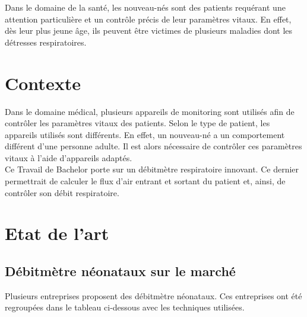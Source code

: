 Dans le domaine de la santé, les nouveau-nés sont des patients requérant une attention particulière et un contrôle précis de leur 
paramètres vitaux. En effet, dès leur plus jeune âge, ils peuvent être victimes de plusieurs maladies dont les détresses respiratoires. 


\section{Contexte}
Dans le domaine médical, plusieurs appareils de monitoring sont utilisés afin de contrôler les paramètres vitaux des patients. 
Selon le type de patient, les appareils utilisés sont différents. En effet, un nouveau-né a un comportement différent d'une personne 
adulte. Il est alors nécessaire de contrôler ces paramètres vitaux à l'aide d'appareils adaptés. \\
Ce Travail de Bachelor porte sur un débitmètre respiratoire innovant. Ce dernier permettrait de calculer le flux d'air entrant et sortant
du patient et, ainsi, de contrôler son débit respiratoire. 
\section{Etat de l'art}
\subsection{Débitmètre néonataux sur le marché}

Plusieurs entreprises proposent des débitmètre néonataux. Ces entreprises ont été regroupées dans le tableau ci-dessous avec les 
techniques utilisées. \\

